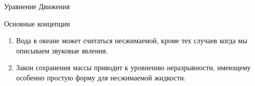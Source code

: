 \begin{chapter}{Уравнение Движения}
\begin{section}{Основные концепции}
\begin{enumerate}
\item
Вода в океане может считаться несжимаемой, кроме тех случаев когда мы
описываем звуковые явления.
%

\item
Закон сохранения массы приводит к уровнению неразрывности, имеющему
особенно простую форму для несжимаемой жидкости.
%
\end{enumerate}
\end{section}
\end{chapter}
